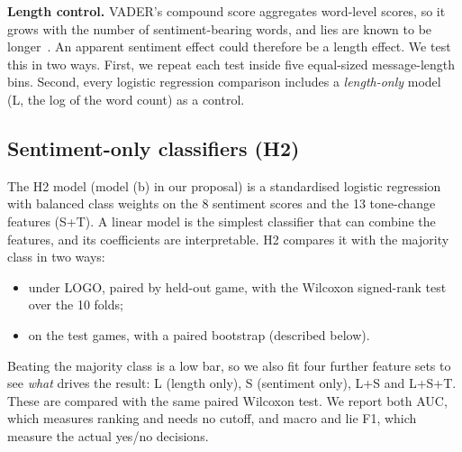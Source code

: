 \documentclass[conference]{IEEEtran}
\begin{document}
\textbf{Length control.} VADER's compound score aggregates word-level scores, so it grows with the number of sentiment-bearing words, and lies are known to be longer~\cite{hancock2008lying,vanswol2012pinocchio}. An apparent sentiment effect could therefore be a length effect. We test this in two ways. First, we repeat each test inside five equal-sized message-length bins. Second, every logistic regression comparison includes a \emph{length-only} model (L, the log of the word count) as a control.

\subsection{Sentiment-only classifiers (H2)}
The H2 model (model (b) in our proposal) is a standardised logistic regression with balanced class weights on the 8 sentiment scores and the 13 tone-change features (S+T). A linear model is the simplest classifier that can combine the features, and its coefficients are interpretable. H2 compares it with the majority class in two ways:
\begin{itemize}
\item under LOGO, paired by held-out game, with the Wilcoxon signed-rank test~\cite{wilcoxon1945individual} over the 10 folds;
\item on the test games, with a paired bootstrap (described below).
\end{itemize}
Beating the majority class is a low bar, so we also fit four further feature sets to see \emph{what} drives the result: L (length only), S (sentiment only), L+S and L+S+T. These are compared with the same paired Wilcoxon test. We report both AUC, which measures ranking and needs no cutoff, and macro and lie F1, which measure the actual yes/no decisions.
\end{document}
